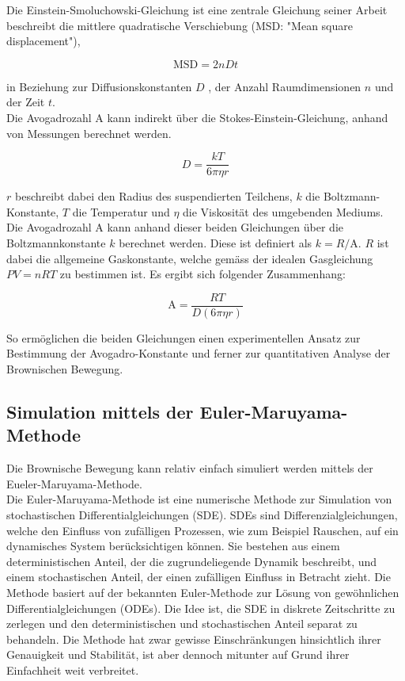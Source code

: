 Die Einstein-Smoluchowski-Gleichung ist eine zentrale Gleichung seiner Arbeit beschreibt die mittlere quadratische Verschiebung (MSD: "Mean square displacement"),

\begin{equation}
	\mathrm{MSD} = 2nDt
\end{equation}

in Beziehung zur Diffusionskonstanten $ D $ , der Anzahl Raumdimensionen $ n $ und der Zeit $ t $.\\


Die Avogadrozahl $ \mathrm{A} $ kann indirekt über die Stokes-Einstein-Gleichung, anhand von Messungen berechnet werden.

\begin{equation}
	D = \frac{kT}{6\pi\eta r}
\end{equation}

$ r $ beschreibt dabei den Radius des suspendierten Teilchens, $ k $ die Boltzmann-Konstante, $ T $ die Temperatur und $ \eta $ die Viskosität des umgebenden Mediums.\\


Die Avogadrozahl $ \mathrm{A} $ kann anhand dieser beiden Gleichungen über die Boltzmannkonstante $ k $ berechnet werden. Diese ist definiert als $ k = R/\mathrm{A} $. $ R $ ist dabei die allgemeine Gaskonstante, welche gemäss der idealen Gasgleichung $ PV = nRT $ zu bestimmen ist. Es ergibt sich folgender Zusammenhang:

\begin{equation}
	\mathrm{A} = \frac{R T}{D (6 \pi \eta r)}
\end{equation}


So ermöglichen die beiden Gleichungen einen experimentellen Ansatz zur Bestimmung der Avogadro-Konstante und ferner zur quantitativen Analyse der Brownischen Bewegung.




\subsection{Simulation mittels der Euler-Maruyama-Methode
\label{brown:section:teil0}}

Die Brownische Bewegung kann relativ einfach simuliert werden mittels der Eueler-Maruyama-Methode.\\


Die Euler-Maruyama-Methode ist eine numerische Methode zur Simulation von stochastischen Differentialgleichungen (SDE). SDEs sind Differenzialgleichungen, welche den Einfluss von zufälligen Prozessen, wie zum Beispiel Rauschen, auf ein dynamisches System berücksichtigen können. Sie bestehen aus einem deterministischen Anteil, der die zugrundeliegende Dynamik beschreibt, und einem stochastischen Anteil, der einen zufälligen Einfluss in Betracht zieht. Die Methode basiert auf der bekannten Euler-Methode zur Lösung von gewöhnlichen Differentialgleichungen (ODEs). Die Idee ist, die SDE in diskrete Zeitschritte zu zerlegen und den deterministischen und stochastischen Anteil separat zu behandeln. Die Methode hat zwar gewisse Einschränkungen hinsichtlich ihrer Genauigkeit und Stabilität, ist aber dennoch mitunter auf Grund ihrer Einfachheit weit verbreitet.\\


